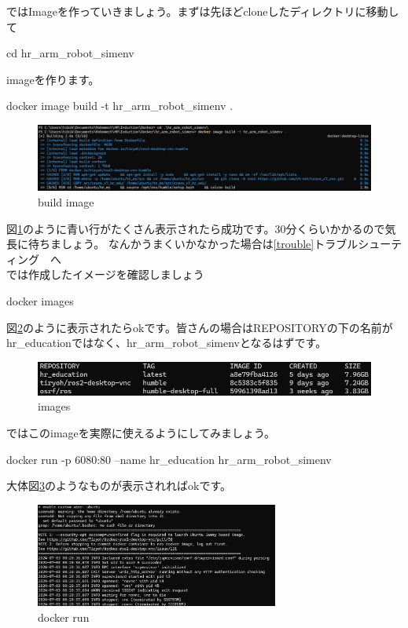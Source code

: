 \documentclass[a4paper,10pt]{jsarticle}
\begin{document}
ではImageを作っていきましょう。まずは先ほどcloneしたディレクトリに移動して
\begin{center}
  cd hr\_arm\_robot\_simenv
\end{center}
imageを作ります。
\begin{center}
  docker image build -t hr\_arm\_robot\_simenv .
\end{center}
\begin{figure}[ht]
  \begin{center}
    \includegraphics[width=12cm]{pictures/build_image.png}
    \caption{build image}
    \label{buildimage}
  \end{center}
\end{figure}

図\ref{buildimage}のように青い行がたくさん表示されたら成功です。30分くらいかかるので気長に待ちましょう。
なんかうまくいかなかった場合は\ref{trouble}トラブルシューティング　へ\\

では作成したイメージを確認しましょう
\begin{center}
  docker images
\end{center}
図\ref{images}のように表示されたらokです。皆さんの場合はREPOSITORYの下の名前がhr\_educationではなく、hr\_arm\_robot\_simenvとなるはずです。
\begin{figure}[ht]
  \begin{center}
    \includegraphics[width=12cm]{pictures/images.png}
    \caption{images}
    \label{images}
  \end{center}
\end{figure}

ではこのimageを実際に使えるようにしてみましょう。
\begin{center}
  docker run -p 6080:80 --name hr\_education hr\_arm\_robot\_simenv
\end{center}
大体図\ref{dockerrun}のようなものが表示されればokです。
\begin{figure}[ht]
  \begin{center}
    \includegraphics[width=8cm]{pictures/docker_run.png}
    \caption{docker run}
    \label{dockerrun}
  \end{center}
\end{figure}
\end{document}
